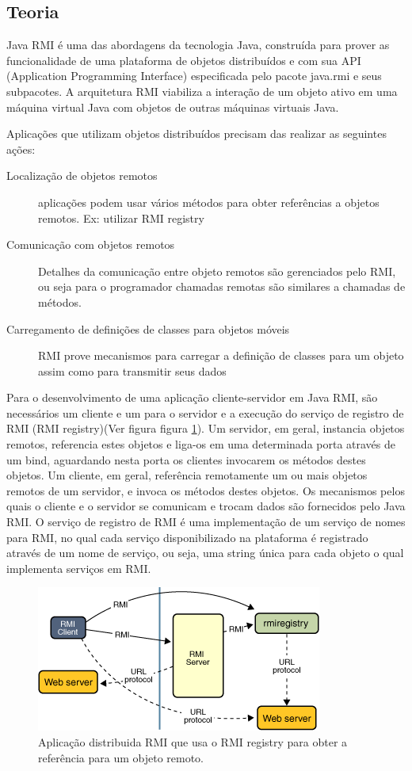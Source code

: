 \documentclass[10pt,a4paper]{article}
\begin{document}
\subsection{Teoria}
Java RMI é uma das abordagens da tecnologia Java, construída para prover as
funcionalidade de uma plataforma de objetos distribuídos e com sua API (Application
Programming Interface) especificada pelo pacote java.rmi e seus subpacotes. A
arquitetura RMI viabiliza a interação de um objeto ativo em uma máquina virtual Java com
objetos de outras máquinas virtuais Java.

Aplicações que utilizam objetos distribuídos precisam das realizar as seguintes ações:
\begin{description}
\item[Localização de objetos remotos] aplicações podem usar vários
  métodos para obter referências a objetos remotos. Ex: utilizar  RMI registry
\item [Comunicação com objetos remotos] Detalhes da comunicação entre
  objeto remotos são gerenciados pelo RMI, ou seja para o programador
  chamadas remotas são similares a chamadas de métodos.
\item [Carregamento de definições de classes para objetos móveis]
  RMI prove mecanismos para carregar a definição de classes para um
  objeto assim como para transmitir seus dados
\end{description}

Para o desenvolvimento de uma aplicação cliente-servidor em Java RMI, são
necessários um cliente e um para o servidor e a
execução do serviço de registro de RMI (RMI registry)(Ver figura
figura \ref{f1}). Um servidor, em geral, instancia
objetos remotos, referencia estes objetos e liga-os em uma determinada porta através de
um bind, aguardando nesta porta os clientes invocarem os métodos destes objetos. Um
cliente, em geral, referência remotamente um ou mais objetos remotos de um servidor, e
invoca os métodos destes objetos. Os mecanismos pelos quais o cliente e o servidor se
comunicam e trocam dados são fornecidos pelo Java RMI. O serviço de registro de RMI é
uma implementação de um serviço de nomes para RMI, no qual cada serviço
disponibilizado na plataforma é registrado através de um nome de serviço, ou seja, uma
string única para cada objeto o qual implementa serviços em RMI.

\begin{figure}[h!]
  \begin{center}
    \includegraphics[scale=0.7]{rmi-img.png}
    \caption{Aplicação distribuida RMI que usa o RMI registry para obter a
      referência para um objeto remoto.}
    \label{f1}
  \end{center}
\end{figure}
\end{document}
